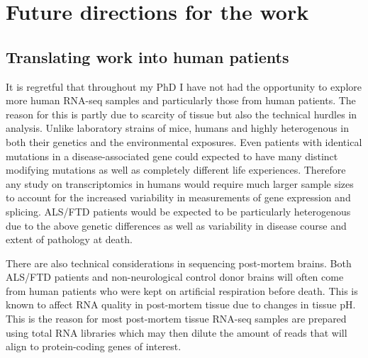 






\section{Future directions for the work}

\subsection{Translating work into human patients}

It is regretful that throughout my PhD I have not had the opportunity to explore more human RNA-seq samples and particularly those from human patients.
The reason for this is partly due to scarcity of tissue but also the technical hurdles in analysis.
Unlike laboratory strains of mice, humans and highly heterogenous in both their genetics and the environmental exposures.
Even patients with identical mutations in a disease-associated gene could  expected to have many distinct modifying mutations as well as completely different life experiences.
Therefore any study on transcriptomics in humans would require much larger sample sizes to account for the increased variability in measurements of gene expression and splicing.
ALS/FTD patients would be expected to be particularly heterogenous due to the above genetic differences as well as variability in disease course and extent of pathology at death.

There are also technical considerations in sequencing post-mortem brains.
Both ALS/FTD patients and non-neurological control donor brains will often come from human patients who were kept on artificial respiration before death. 
This is known to affect RNA quality in post-mortem tissue due to changes in tissue pH.
This is the reason for most post-mortem tissue RNA-seq samples are prepared using total RNA libraries which may then dilute the amount of reads that will align to protein-coding genes of interest.

